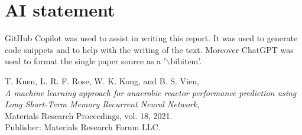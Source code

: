 \documentclass[conference]{IEEEtran}
\begin{document}
\section*{AI statement}
GitHub Copilot was used to assist in writing this report. It was used to generate code snippets and
to help with the writing of the text. Moreover ChatGPT was used to format the single paper source as a 
'$\backslash$bibitem'.


\begin{thebibliography}{9}

    T. Kuen, L. R. F. Rose, W. K. Kong, and B. S. Vien,\\
    \textit{A machine learning approach for anaerobic reactor performance prediction using Long Short-Term Memory Recurrent Neural Network},\\
    Materials Research Proceedings, vol. 18, 2021.\\
    Publisher: Materials Research Forum LLC.
    
    \end{thebibliography}
    
\end{document}
